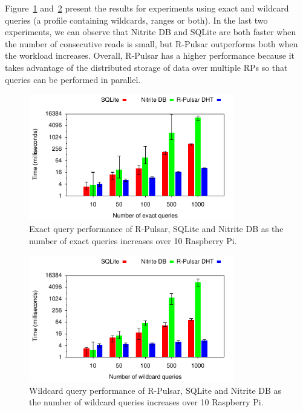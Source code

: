 Figure~\ref{fig:DBExactBar} and~\ref{fig:DBWildBar} present the results for experiments using exact and wildcard queries (a profile containing wildcards, ranges or both).
In the last two experiments, we can observe that Nitrite DB and SQLite are both faster when the number of consecutive reads is small, but R-Pulsar outperforms both when the workload increases. 
Overall, R-Pulsar has a higher performance because it takes advantage of the distributed storage of data over multiple RPs so that queries can be performed in parallel.

\begin{figure}[h!]
  \centering
  \includegraphics[width=0.8\textwidth]{Results/DBExactBar}
  \caption{Exact query performance of R-Pulsar, SQLite and Nitrite DB as the number of exact queries increases over 10 Raspberry Pi.}
  \label{fig:DBExactBar}
\end{figure}

\begin{figure}[h!]
  \centering
  \includegraphics[width=0.8\textwidth]{Results/DBWildBar}
  \caption{Wildcard query performance of R-Pulsar, SQLite and Nitrite DB as the number of wildcard queries increases over 10 Raspberry Pi.}
  \label{fig:DBWildBar}
\end{figure}


